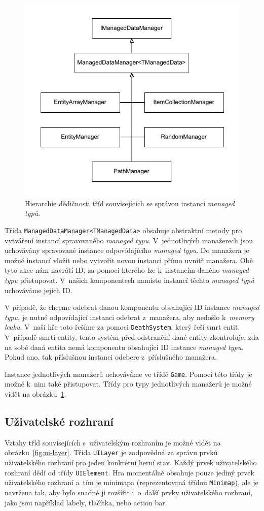 \begin{figure}[!htb]
  \centering
  \includegraphics[width=0.6\linewidth]{img/managed_data_managers.pdf}
  \caption{Hierarchie dědičnosti tříd souvisejících se správou instancí \textit{managed typů}.}
  \label{fig:unmanaged-data-managers}
\end{figure}

Třída \texttt{ManagedDataManager<TManagedData>} obsahuje abstraktní metody pro vytváření instancí spravovaného \textit{managed typu}. V~jednotlivých manažerech jsou uchovávány spravované instance odpovídajícího \textit{managed typu}. Do manažera je možné instancí vložit nebo vytvořit novou instanci přímo uvnitř manažera. Obě tyto akce nám navrátí ID, za pomoci kterého lze k~instancím daného \textit{managed typu} přistupovat. V~našich komponentech namísto instancí těchto \textit{managed typů} uchováváme jejich ID.

V případě, že chceme odebrat danou komponentu obsahující ID instance \textit{managed typu}, je nutné odpovídající instanci odebrat z~manažera, aby nedošlo k~\textit{memory leaku}. V~naší hře toto řešíme za pomoci \texttt{DeathSystem}, který řeší smrt entit. V~případě smrti entity, tento systém před odstranění dané entity zkontroluje, zda na sobě daná entita nemá komponentu obsahující ID instance \textit{managed typu}. Pokud ano, tak příslušnou instanci odebere z~příslušného manažera.

Instance jednotlivých manažerů uchováváme ve třídě \texttt{Game}. Pomocí této třídy je možné k~nim také přistupovat. Třídy pro typy jednotlivých manažerů je možné vidět na obrázku~\ref{fig:unmanaged-data-managers}.

\subsection{Uživatelské rozhraní}
Vztahy tříd souvisejících s~uživatelským rozhraním je možné vidět na obrázku~\ref{fig:ui-layer}. Třída \texttt{UILayer} je zodpovědná za správu prvků uživatelského rozhraní pro jeden konkrétní herní stav. Každý prvek uživatelského rozhraní dědí od třídy \texttt{UIElement}. Hra momentálně obsahuje pouze jediný prvek uživatelského rozhraní a~tím je minimapa (reprezentovaná třídou \texttt{Minimap}), ale je navržena tak, aby bylo snadné ji rozšířit i~o~další prvky uživatelského rozhraní, jako jsou například labely, tlačítka, nebo action bar.

